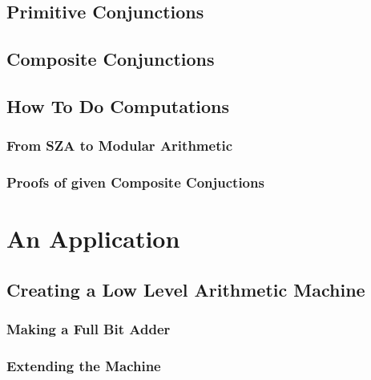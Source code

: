 \documentclass[12pt]{report}
\theoremstyle{definition}
\theoremstyle{remark}
\begin{document}
  \section{Primitive Conjunctions}

  \section{Composite Conjunctions}

  \section{How To Do Computations}
    \subsection{From SZA to Modular Arithmetic}
    \subsection{Proofs of given Composite Conjuctions}

\newpage

\chapter{An Application}
  \section{Creating a Low Level Arithmetic Machine}
    \subsection{Making a Full Bit Adder}

    \subsection{Extending the Machine}
\end{document}
